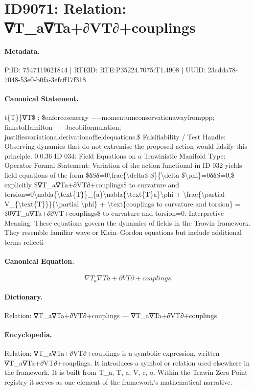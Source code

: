 \section*{ID9071: Relation: ∇T\_a∇Ta+∂VT∂+couplings}
\paragraph{Metadata.}
PiID: 7547119621844 | RTEID: RTE:P35224.7075:T1.4908 | UUID: 23cdda78-7048-53e0-b0fa-3efcff17f318

\paragraph{Canonical Statement.}
t\{T\}\}∇T\$ ; \$enforcesenergy −−momentumconservationawayfromppp; linkstoHamilton− −Jacobiformulation; justifiesvariationalderivationoffieldequations.\$ Falsifiability / Test Handle: Observing dynamics that do not extremise the proposed action would falsify this principle. 0.0.36 ID 034: Field Equations on a Trawinistic Manifold Type: Operator Formal Statement: Variation of the action functional in ID 032 yields field equations of the form \$δSδ=0\textbackslash{}frac\{\textbackslash{}delta\$ S\}\{\textbackslash{}delta \$\textbackslash{}phi\}=0δδS=0,\$ explicitly \$∇T\_a∇Ta+∂VT∂+couplings\$ to curvature and torsion=0\textbackslash{}nabla\{\textbackslash{}text\{T\}\}\_\{a\}\textbackslash{}nabla\{\textbackslash{}text\{T\}a\}\textbackslash{}phi + \textbackslash{}frac\{\textbackslash{}partial V\_\{\textbackslash{}text\{T\}\}\}\{\textbackslash{}partial \textbackslash{}phi\} + \textbackslash{}text\{couplings to curvature and torsion\} = \$0∇T\_a∇Ta+∂∂VT+couplings\$ to curvature and torsion=0. Interpretive Meaning: These equations govern the dynamics of fields in the Trawin framework. They resemble familiar wave or Klein–Gordon equations but include additional terms reflecti

\paragraph{Canonical Equation.}
\[
∇T_a∇Ta+∂VT∂+couplings
\]

\paragraph{Dictionary.}
Relation: ∇T\_a∇Ta+∂VT∂+couplings — ∇T\_a∇Ta+∂VT∂+couplings

\paragraph{Encyclopedia.}
Relation: ∇T\_a∇Ta+∂VT∂+couplings is a symbolic expression, written ∇T\_a∇Ta+∂VT∂+couplings. It introduces a symbol or relation used elsewhere in the framework. It is built from T\_a, T, a, V, c, o. Within the Trawin Zero Point registry it serves as one element of the framework's mathematical narrative.
